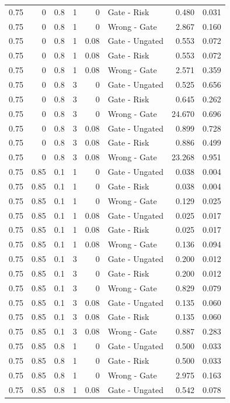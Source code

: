 \begin{longtable}{rrrrrlrr}
0.75 & 0 & 0.8 & 1 & 0 & Gate - Risk & 0.480 & 0.031\\
0.75 & 0 & 0.8 & 1 & 0 & Wrong - Gate & 2.867 & 0.160\\
0.75 & 0 & 0.8 & 1 & 0.08 & Gate - Ungated & 0.553 & 0.072\\
0.75 & 0 & 0.8 & 1 & 0.08 & Gate - Risk & 0.553 & 0.072\\
0.75 & 0 & 0.8 & 1 & 0.08 & Wrong - Gate & 2.571 & 0.359\\
0.75 & 0 & 0.8 & 3 & 0 & Gate - Ungated & 0.525 & 0.656\\
0.75 & 0 & 0.8 & 3 & 0 & Gate - Risk & 0.645 & 0.262\\
0.75 & 0 & 0.8 & 3 & 0 & Wrong - Gate & 24.670 & 0.696\\
0.75 & 0 & 0.8 & 3 & 0.08 & Gate - Ungated & 0.899 & 0.728\\
0.75 & 0 & 0.8 & 3 & 0.08 & Gate - Risk & 0.886 & 0.499\\
0.75 & 0 & 0.8 & 3 & 0.08 & Wrong - Gate & 23.268 & 0.951\\
0.75 & 0.85 & 0.1 & 1 & 0 & Gate - Ungated & 0.038 & 0.004\\
0.75 & 0.85 & 0.1 & 1 & 0 & Gate - Risk & 0.038 & 0.004\\
0.75 & 0.85 & 0.1 & 1 & 0 & Wrong - Gate & 0.129 & 0.025\\
0.75 & 0.85 & 0.1 & 1 & 0.08 & Gate - Ungated & 0.025 & 0.017\\
0.75 & 0.85 & 0.1 & 1 & 0.08 & Gate - Risk & 0.025 & 0.017\\
0.75 & 0.85 & 0.1 & 1 & 0.08 & Wrong - Gate & 0.136 & 0.094\\
0.75 & 0.85 & 0.1 & 3 & 0 & Gate - Ungated & 0.200 & 0.012\\
0.75 & 0.85 & 0.1 & 3 & 0 & Gate - Risk & 0.200 & 0.012\\
0.75 & 0.85 & 0.1 & 3 & 0 & Wrong - Gate & 0.829 & 0.079\\
0.75 & 0.85 & 0.1 & 3 & 0.08 & Gate - Ungated & 0.135 & 0.060\\
0.75 & 0.85 & 0.1 & 3 & 0.08 & Gate - Risk & 0.135 & 0.060\\
0.75 & 0.85 & 0.1 & 3 & 0.08 & Wrong - Gate & 0.887 & 0.283\\
0.75 & 0.85 & 0.8 & 1 & 0 & Gate - Ungated & 0.500 & 0.033\\
0.75 & 0.85 & 0.8 & 1 & 0 & Gate - Risk & 0.500 & 0.033\\
0.75 & 0.85 & 0.8 & 1 & 0 & Wrong - Gate & 2.975 & 0.163\\
0.75 & 0.85 & 0.8 & 1 & 0.08 & Gate - Ungated & 0.542 & 0.078\\

\end{longtable}
